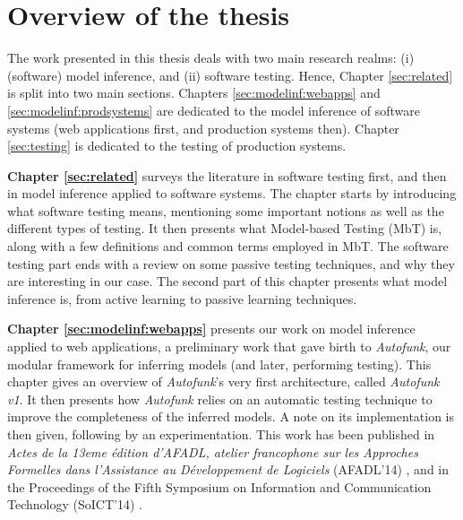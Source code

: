 
\section{Overview of the thesis}
\label{sec:intro:overview}

The work presented in this thesis deals with two main research
realms: (i) (software) model inference, and (ii) software
testing. Hence, Chapter \ref{sec:related} is split into two main
sections. Chapters \ref{sec:modelinf:webapps} and
\ref{sec:modelinf:prodsystems} are dedicated to the model
inference of software systems (web applications first, and
production systems then). Chapter \ref{sec:testing} is dedicated
to the testing of production systems.

\textbf{Chapter \ref{sec:related}} surveys the literature in
software testing first, and then in model inference applied to
software systems. The chapter starts by introducing what software
testing means, mentioning some important notions as well as the
different types of testing. It then presents what Model-based
Testing (MbT) is, along with a few definitions and common terms
employed in MbT. The software testing part ends with a review on
some passive testing techniques, and why they are interesting in
our case. The second part of this chapter presents what model
inference is, from active learning to passive learning
techniques.

\textbf{Chapter \ref{sec:modelinf:webapps}} presents our work on
model inference applied to web applications, a preliminary work
that gave birth to \textit{Autofunk}, our modular framework for
inferring models (and later, performing testing). This chapter
gives an overview of \textit{Autofunk}'s very first architecture,
called \emph{Autofunk v1}.  It then presents how
\textit{Autofunk} relies on an automatic testing technique to
improve the completeness of the inferred models. A note on its
implementation is then given, following by an experimentation.
This work has been published in \emph{Actes de la 13eme
{\'e}dition d’AFADL, atelier francophone sur les Approches
Formelles dans l’Assistance au D{\'e}veloppement de Logiciels}
(AFADL'14) \cite{durand2014inference}, and in the Proceedings of
the Fifth Symposium on Information and Communication Technology
(SoICT'14)
\cite{DBLP:conf/soict/DurandS14}.

